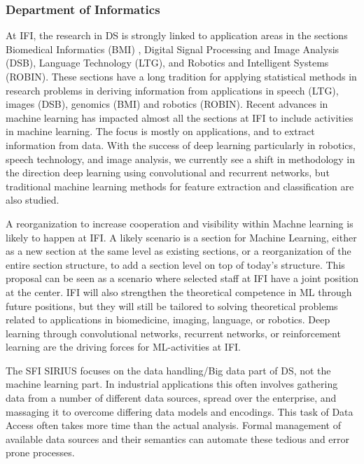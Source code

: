 \documentclass[a4paper,10pt]{article}
\begin{document}
\subsubsection*{Department of Informatics}
	 	 	 	
At IFI, the research in DS is strongly linked to application areas in the sections Biomedical Informatics (BMI) , Digital Signal Processing and Image Analysis (DSB), Language Technology (LTG), and Robotics and Intelligent Systems (ROBIN). These sections have a long tradition for applying statistical methods in research problems in deriving information from applications in speech (LTG), images (DSB), genomics (BMI) and robotics (ROBIN). Recent advances in machine learning has impacted almost all the sections at IFI to include activities in machine learning. The focus is mostly on applications, and to extract information from data.
With the success of deep learning particularly in robotics, speech technology, and image analysis, we currently see a shift in methodology in the direction deep learning using convolutional and recurrent networks, but traditional machine learning methods for feature extraction and classification are also studied.

A reorganization to increase cooperation and visibility within Machne learning  is likely to happen at IFI. A likely scenario is a section for Machine Learning, either as a new section at the same level as existing sections, or a reorganization of the entire section structure, to add a section level on top of today's structure. This proposal can be seen as a scenario where selected staff at IFI have a joint position at the center. IFI will also strengthen the theoretical competence in ML through future positions, but they will still be tailored to solving theoretical problems related to applications in biomedicine, imaging, language, or robotics. Deep learning through convolutional networks,  recurrent networks, or reinforcement learning are the driving forces for ML-activities at IFI.  




The SFI SIRIUS focuses on the data handling/Big data part of DS, not the machine learning part. In industrial applications this often involves gathering data from a number of different data sources, spread over the enterprise, and massaging it to overcome differing data models and encodings.  This task of Data Access often takes more time than the actual analysis.  Formal management of available data sources and their semantics can automate these tedious and error prone processes.
\end{document}
